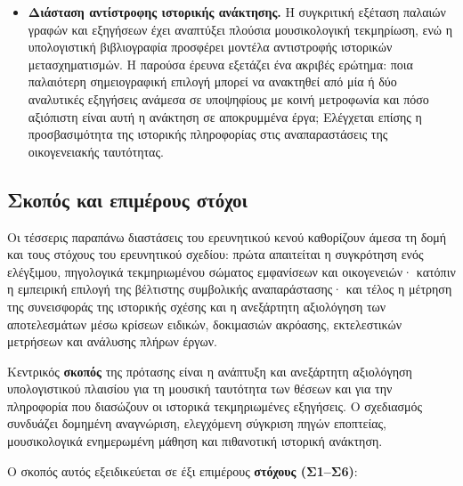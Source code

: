 \documentclass[11pt,a4paper]{article}
\begin{document}
\begin{itemize}
\item
  \textbf{Διάσταση αντίστροφης ιστορικής ανάκτησης.} Η συγκριτική εξέταση παλαιών γραφών και εξηγήσεων έχει αναπτύξει πλούσια μουσικολογική τεκμηρίωση, ενώ η υπολογιστική βιβλιογραφία προσφέρει μοντέλα αντιστροφής ιστορικών μετασχηματισμών. Η παρούσα έρευνα εξετάζει ένα ακριβές ερώτημα: ποια παλαιότερη σημειογραφική επιλογή μπορεί να ανακτηθεί από μία ή δύο αναλυτικές εξηγήσεις ανάμεσα σε υποψηφίους με κοινή μετροφωνία και πόσο αξιόπιστη είναι αυτή η ανάκτηση σε αποκρυμμένα έργα; Ελέγχεται επίσης η προσβασιμότητα της ιστορικής πληροφορίας στις αναπαραστάσεις της οικογενειακής ταυτότητας.
\end{itemize}

\subsection{Σκοπός και επιμέρους στόχοι}\label{ux3c3ux3baux3bfux3c0ux3ccux3c2-ux3baux3b1ux3b9-ux3b5ux3c0ux3b9ux3bcux3adux3c1ux3bfux3c5ux3c2-ux3c3ux3c4ux3ccux3c7ux3bfux3b9}

Οι τέσσερις παραπάνω διαστάσεις του ερευνητικού κενού καθορίζουν άμεσα τη δομή και τους στόχους του ερευνητικού σχεδίου: πρώτα απαιτείται η συγκρότηση ενός ελέγξιμου, πηγολογικά τεκμηριωμένου σώματος εμφανίσεων και οικογενειών· κατόπιν η εμπειρική επιλογή της βέλτιστης συμβολικής αναπαράστασης· και τέλος η μέτρηση της συνεισφοράς της ιστορικής σχέσης και η ανεξάρτητη αξιολόγηση των αποτελεσμάτων μέσω κρίσεων ειδικών, δοκιμασιών ακρόασης, εκτελεστικών μετρήσεων και ανάλυσης πλήρων έργων.

Κεντρικός \textbf{σκοπός} της πρότασης είναι η ανάπτυξη και ανεξάρτητη αξιολόγηση υπολογιστικού πλαισίου για τη μουσική ταυτότητα των θέσεων και για την πληροφορία που διασώζουν οι ιστορικά τεκμηριωμένες εξηγήσεις. Ο σχεδιασμός συνδυάζει δομημένη αναγνώριση, ελεγχόμενη σύγκριση πηγών εποπτείας, μουσικολογικά ενημερωμένη μάθηση και πιθανοτική ιστορική ανάκτηση.

Ο σκοπός αυτός εξειδικεύεται σε έξι επιμέρους \textbf{στόχους (Σ1--Σ6)}:
\end{document}
